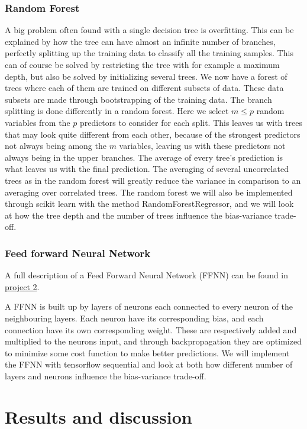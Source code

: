 \documentclass[11pt]{article}
\begin{document}
\subsubsection*{Random Forest}
A big problem often found with a single decision tree is overfitting. This can be explained by how the tree can have almost an infinite number of branches, perfectly splitting up the training data to classify all the training samples. This can of course be solved by restricting the tree with for example a maximum depth, but also be solved by initializing several trees. We now have a forest of trees where each of them are trained on different subsets of data. These data subsets are made through bootstrapping of the training data. The branch splitting is done differently in a random forest. Here we select $m \leq p$ random variables from the $p$ predictors to consider for each split. This leaves us with trees that may look quite different from each other, because of the strongest predictors not always being among the $m$ variables, leaving us with these predictors not always being in the upper branches. The average of every tree's prediction is what leaves us with the final prediction. The averaging of several uncorrelated trees as in the random forest will greatly reduce the variance in comparison to an averaging over correlated trees. The random forest we will also be implemented through scikit learn with the method RandomForestRegressor, and we will look at how the tree depth and the number of trees influence the bias-variance trade-off.

\subsubsection*{Feed forward Neural Network}
A full description of a Feed Forward Neural Network (FFNN) can be found in \href{https://github.com/Fslippe/FYS-STK4155/blob/main/project2/latex/project2.pdf}{project 2}.


A FFNN is built up by layers of neurons each connected to every neuron of the neighbouring layers. Each neuron have its corresponding bias, and each connection have its own corresponding weight. These are respectively added and multiplied to the neurons input, and through backpropagation they are optimized to minimize some cost function to make better predictions. We will implement the FFNN with tensorflow sequential and look at both how different number of layers and neurons influence the bias-variance trade-off.

\section{Results and discussion}
\end{document}
